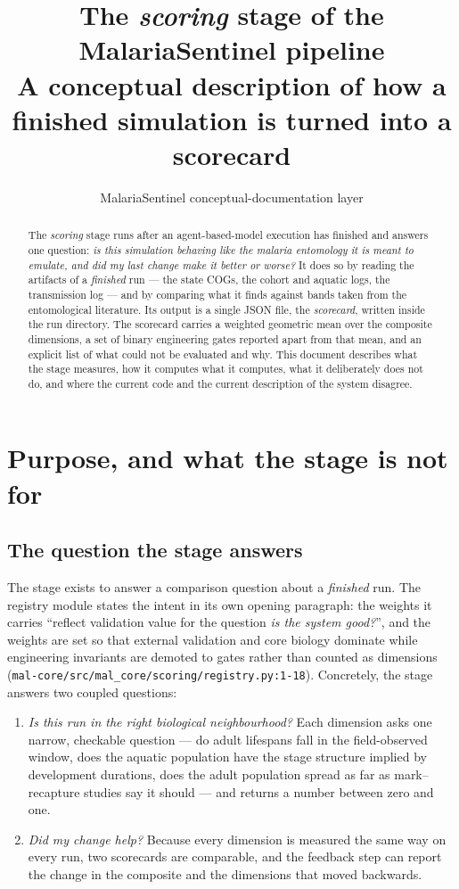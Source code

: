 \documentclass[11pt,a4paper]{article}
\title{The \emph{scoring} stage of the MalariaSentinel pipeline\\[3pt]
\large A conceptual description of how a finished simulation is turned into a scorecard}
\author{MalariaSentinel conceptual-documentation layer}
\date{}
\newcommand{\code}[1]{\texttt{#1}}
\begin{document}
\maketitle

\begin{abstract}
The \emph{scoring} stage runs after an agent-based-model execution has finished and
answers one question: \emph{is this simulation behaving like the malaria
entomology it is meant to emulate, and did my last change make it better or
worse?} It does so by reading the artifacts of a \emph{finished} run --- the
state COGs, the cohort and aquatic logs, the transmission log --- and by
comparing what it finds against bands taken from the entomological
literature. Its output is a single JSON file, the \emph{scorecard}, written
inside the run directory. The scorecard carries a weighted geometric mean
over the composite dimensions, a set of binary engineering gates reported
apart from that mean, and an explicit list of what could not be evaluated and
why. This document describes what the stage measures, how it computes what it
computes, what it deliberately does not do, and where the current code and the
current description of the system disagree.
\end{abstract}

\section{Purpose, and what the stage is not for}

\subsection{The question the stage answers}

The stage exists to answer a comparison question about a \emph{finished} run.
The registry module states the intent in its own opening paragraph: the
weights it carries ``reflect validation value for the question
\emph{is the system good?}'', and the weights are set so that external
validation and core biology dominate while engineering invariants are demoted
to gates rather than counted as dimensions
(\code{mal-core/src/mal\_core/scoring/registry.py:1-18}). Concretely, the
stage answers two coupled questions:

\begin{enumerate}
\item \emph{Is this run in the right biological neighbourhood?} Each
      dimension asks one narrow, checkable question --- do adult lifespans
      fall in the field-observed window, does the aquatic population have
      the stage structure implied by development durations, does the adult
      population spread as far as mark--recapture studies say it should ---
      and returns a number between zero and one.
\item \emph{Did my change help?} Because every dimension is measured the same
      way on every run, two scorecards are comparable, and the feedback step
      can report the change in the composite and the dimensions that moved
      backwards.
\end{enumerate}
\end{document}
